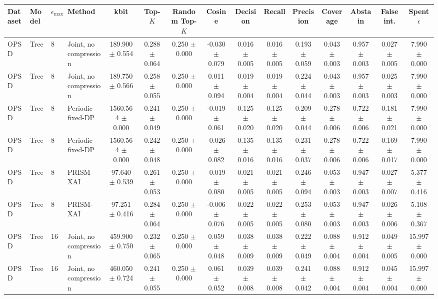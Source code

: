 \begin{tabular}{llllccccccccccc}
\toprule
Dataset & Model & $\epsilon_{\max}$ & Method & kbit & Top-$K$ & Random Top-$K$ & Cosine & Decision & Recall & Precision & Coverage & Abstain & False int. & Spent $\epsilon$ \\
\midrule
OPSD & Tree & 8 & Joint, no compression & 189.900 $\pm$ 0.554 & 0.288 $\pm$ 0.064 & 0.250 $\pm$ 0.000 & -0.030 $\pm$ 0.079 & 0.016 $\pm$ 0.005 & 0.016 $\pm$ 0.005 & 0.193 $\pm$ 0.059 & 0.043 $\pm$ 0.003 & 0.957 $\pm$ 0.003 & 0.027 $\pm$ 0.005 & 7.990 $\pm$ 0.000 \\
OPSD & Tree & 8 & Joint, no compression & 189.750 $\pm$ 0.566 & 0.258 $\pm$ 0.055 & 0.250 $\pm$ 0.000 & 0.011 $\pm$ 0.094 & 0.019 $\pm$ 0.004 & 0.019 $\pm$ 0.004 & 0.224 $\pm$ 0.044 & 0.043 $\pm$ 0.003 & 0.957 $\pm$ 0.003 & 0.025 $\pm$ 0.003 & 7.990 $\pm$ 0.000 \\
OPSD & Tree & 8 & Periodic fixed-DP & 1560.564 $\pm$ 0.000 & 0.241 $\pm$ 0.049 & 0.250 $\pm$ 0.000 & -0.019 $\pm$ 0.061 & 0.125 $\pm$ 0.020 & 0.125 $\pm$ 0.020 & 0.209 $\pm$ 0.044 & 0.278 $\pm$ 0.006 & 0.722 $\pm$ 0.006 & 0.181 $\pm$ 0.021 & 7.990 $\pm$ 0.000 \\
OPSD & Tree & 8 & Periodic fixed-DP & 1560.564 $\pm$ 0.000 & 0.242 $\pm$ 0.048 & 0.250 $\pm$ 0.000 & -0.026 $\pm$ 0.082 & 0.135 $\pm$ 0.016 & 0.135 $\pm$ 0.016 & 0.231 $\pm$ 0.037 & 0.278 $\pm$ 0.006 & 0.722 $\pm$ 0.006 & 0.169 $\pm$ 0.017 & 7.990 $\pm$ 0.000 \\
OPSD & Tree & 8 & PRISM-XAI & 97.640 $\pm$ 0.539 & 0.261 $\pm$ 0.053 & 0.250 $\pm$ 0.000 & -0.019 $\pm$ 0.080 & 0.021 $\pm$ 0.005 & 0.021 $\pm$ 0.005 & 0.246 $\pm$ 0.094 & 0.053 $\pm$ 0.003 & 0.947 $\pm$ 0.003 & 0.027 $\pm$ 0.007 & 5.377 $\pm$ 0.416 \\
OPSD & Tree & 8 & PRISM-XAI & 97.251 $\pm$ 0.416 & 0.284 $\pm$ 0.064 & 0.250 $\pm$ 0.000 & -0.006 $\pm$ 0.076 & 0.022 $\pm$ 0.005 & 0.022 $\pm$ 0.005 & 0.253 $\pm$ 0.080 & 0.053 $\pm$ 0.003 & 0.947 $\pm$ 0.003 & 0.026 $\pm$ 0.006 & 5.108 $\pm$ 0.367 \\
OPSD & Tree & 16 & Joint, no compression & 459.900 $\pm$ 0.750 & 0.232 $\pm$ 0.065 & 0.250 $\pm$ 0.000 & 0.059 $\pm$ 0.048 & 0.038 $\pm$ 0.009 & 0.038 $\pm$ 0.009 & 0.222 $\pm$ 0.049 & 0.088 $\pm$ 0.004 & 0.912 $\pm$ 0.004 & 0.049 $\pm$ 0.005 & 15.997 $\pm$ 0.000 \\
OPSD & Tree & 16 & Joint, no compression & 460.050 $\pm$ 0.724 & 0.241 $\pm$ 0.055 & 0.250 $\pm$ 0.000 & 0.061 $\pm$ 0.052 & 0.039 $\pm$ 0.008 & 0.039 $\pm$ 0.008 & 0.241 $\pm$ 0.042 & 0.088 $\pm$ 0.004 & 0.912 $\pm$ 0.004 & 0.045 $\pm$ 0.004 & 15.997 $\pm$ 0.000 \\

\end{tabular}
